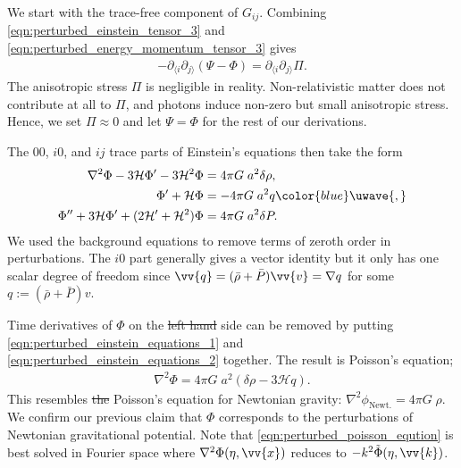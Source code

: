 \documentclass[a4paper,12pt,times,custombib,print,index]{Classes/PhDThesisPSnPDF} %
\providecommand{\DIFadd}[1]{{\protect\color{blue}\uwave{#1}}} %
\providecommand{\DIFdel}[1]{{\protect\color{red}\sout{#1}}}                      %
\providecommand{\DIFaddbegin}{} %
\providecommand{\DIFaddend}{} %
\providecommand{\DIFdelbegin}{} %
\providecommand{\DIFdelend}{} %
\newcommand{\DIFscaledelfig}{0.5}
\newlength{\DIFdelgraphicswidth} %
\newlength{\DIFdelgraphicsheight} %
\newcommand{\DIFaddincludegraphics}[2][]{{\color{blue}\fbox{\DIFOincludegraphics[#1]{#2}}}} %
\newcommand{\DIFdelincludegraphics}[2][]{%
\sbox{\DIFdelgraphicsbox}{\DIFOincludegraphics[#1]{#2}}%
\settoboxwidth{\DIFdelgraphicswidth}{\DIFdelgraphicsbox} %
\settoboxtotalheight{\DIFdelgraphicsheight}{\DIFdelgraphicsbox} %
\scalebox{\DIFscaledelfig}{%
\parbox[b]{\DIFdelgraphicswidth}{\usebox{\DIFdelgraphicsbox}\\[-\baselineskip] \rule{\DIFdelgraphicswidth}{0em}}\llap{\resizebox{\DIFdelgraphicswidth}{\DIFdelgraphicsheight}{%
\setlength{\unitlength}{\DIFdelgraphicswidth}%
\begin{picture}(1,1)%
\thicklines\linethickness{2pt} %
{\color[rgb]{1,0,0}\put(0,0){\framebox(1,1){}}}%
{\color[rgb]{1,0,0}\put(0,0){\line( 1,1){1}}}%
{\color[rgb]{1,0,0}\put(0,1){\line(1,-1){1}}}%
\end{picture}%
}\hspace*{3pt}}} %
} %
\DeclareRobustCommand{\DIFaddbegin}{\DIFOaddbegin \let\includegraphics\DIFaddincludegraphics} %
\DeclareRobustCommand{\DIFaddend}{\DIFOaddend \let\includegraphics\DIFOincludegraphics} %
\DeclareRobustCommand{\DIFdelbegin}{\DIFOdelbegin \let\includegraphics\DIFdelincludegraphics} %
\DeclareRobustCommand{\DIFdelend}{\DIFOaddend \let\includegraphics\DIFOincludegraphics} %
\begin{document}
We start with the trace-free component of $G_{ij}$. Combining  \eqref{eqn:perturbed_einstein_tensor_3} and \eqref{eqn:perturbed_energy_momentum_tensor_3} gives
\begin{align}
	-\partial_{\langle i} \partial_{j \rangle} (\Psi - \Phi) = \partial_{\langle i} \partial_{j \rangle} \Pi.
\end{align}
The anisotropic stress $\Pi$ is negligible in reality. Non-relativistic matter does not contribute at all to $\Pi$, and photons induce non-zero but small anisotropic stress. Hence, we set $\Pi\approx 0$ and let $\Psi = \Phi$ for the rest of our derivations.

The $00$, $i0$, and $ij$ trace parts of Einstein's equations then take the form
\begin{align}
	\nabla^2 \Phi - 3 \mathcal{H} \Phi' - 3\mathcal{H}^2 \Phi &= 4\pi G \; a^2 \delta\rho, \label{eqn:perturbed_einstein_equations_1}\\
	\Phi' + \mathcal{H} \Phi &= -4\pi G \; a^2 q\DIFaddbegin \DIFadd{, }\DIFaddend \label{eqn:perturbed_einstein_equations_2}\\
	\Phi'' + 3\mathcal{H} \Phi' + (2\mathcal{H}' + \mathcal{H}^2) \Phi &= 4\pi G \; a^2 \delta P. \label{eqn:perturbed_einstein_equations_3}
\end{align}
We used the background equations to remove terms of zeroth order in perturbations. The $i0$ part generally gives a vector identity but it only has one scalar degree of freedom since $\vv{q}=(\bar{\rho}+\bar{P})\vv{v} = \nabla q$ for some $q := (\bar{\rho}+\bar{P}) v$.

Time derivatives of $\Phi$ on the \DIFdelbegin \DIFdel{left hand }\DIFdelend \DIFaddbegin \DIFadd{left-hand }\DIFaddend side can be removed by putting \eqref{eqn:perturbed_einstein_equations_1} and \eqref{eqn:perturbed_einstein_equations_2} together. The result is Poisson's equation;
\begin{align}
	\nabla^2 \Phi = 4\pi G \; a^2 (\delta\rho - 3\mathcal{H}q). \label{eqn:perturbed_poisson_eqution}
\end{align}
This resembles \DIFdelbegin \DIFdel{the }\DIFdelend Poisson's equation for Newtonian gravity: $\nabla^2 \phi_{\text{Newt.}} = 4\pi G \; \rho$. We confirm our previous claim that $\Phi$ corresponds to the perturbations of \DIFaddbegin \DIFadd{the }\DIFaddend Newtonian gravitational potential. Note that \eqref{eqn:perturbed_poisson_eqution} is best solved in Fourier space where $\nabla^2\Phi(\eta,\vv{x})$ reduces to $-k^2 \tilde{\Phi}(\eta,\vv{k})$.
\end{document}
